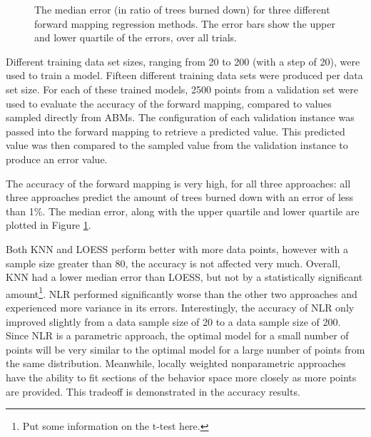 \begin{figure}[ht]
\caption{The median error (in ratio of trees burned down) for three different forward mapping regression methods.
The error bars show the upper and lower quartile of the errors, over all trials.}
\label{fig:fmacc}
\end{figure}

Different training data set sizes, ranging from 20 to 200 (with a step of 20), were used to train a model.
Fifteen different training data sets were produced per data set size.
For each of these trained models, 2500 points from a validation set were used to evaluate the accuracy of the forward mapping, compared to values sampled directly from ABMs.
The configuration of each validation instance was passed into the forward mapping to retrieve a predicted value.
This predicted value was then compared to the sampled value from the validation instance to produce an error value.

The accuracy of the forward mapping is very high, for all three approaches: all three approaches predict the amount of trees burned down with an error of less than 1\%.
The median error, along with the upper quartile and lower quartile are plotted in Figure \ref{fig:fmacc}.

Both KNN and LOESS perform better with more data points, however with a sample size greater than 80, the accuracy is not affected very much.
Overall, KNN had a lower median error than LOESS, but not by a statistically significant amount\footnote{Put some information on the t-test here.}.
NLR performed significantly worse than the other two approaches and experienced more variance in its errors.
Interestingly, the accuracy of NLR only improved slightly from a data sample size of 20 to a data sample size of 200.
Since NLR is a parametric approach, the optimal model for a small number of points will be very similar to the optimal model for a large number of points from the same distribution.
Meanwhile, locally weighted nonparametric approaches have the ability to fit sections of the behavior space more closely as more points are provided.
This tradeoff is demonstrated in the accuracy results.


